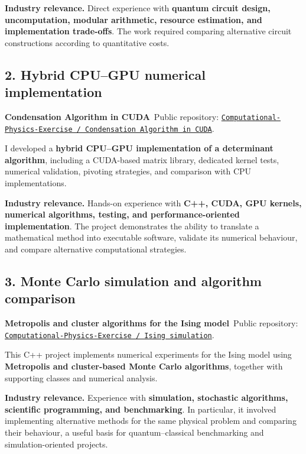 \documentclass[10pt,a4paper]{article}
\newcommand{\relevance}[1]{\textbf{Industry relevance.} #1}
\begin{document}
\relevance{Direct experience with \textbf{quantum circuit design, uncomputation, modular arithmetic, resource estimation,
and implementation trade-offs}. The work required comparing alternative circuit constructions according to quantitative
costs.}

\subsection*{2. Hybrid CPU--GPU numerical implementation}

\textbf{Condensation Algorithm in CUDA}\
Public repository:
\href{https://github.com/MasterToninus/Computational-Physics-Exercise/tree/master/Condensation\%20Algorithm\%20in\%20CUDA}
{\texttt{Computational-Physics-Exercise / Condensation Algorithm in CUDA}}.

I developed a \textbf{hybrid CPU--GPU implementation of a determinant algorithm}, including a CUDA-based matrix library,
dedicated kernel tests, numerical validation, pivoting strategies, and comparison with CPU implementations.

\relevance{Hands-on experience with \textbf{C++, CUDA, GPU kernels, numerical algorithms, testing, and performance-oriented
implementation}. The project demonstrates the ability to translate a mathematical method into executable software,
validate its numerical behaviour, and compare alternative computational strategies.}

\subsection*{3. Monte Carlo simulation and algorithm comparison}

\textbf{Metropolis and cluster algorithms for the Ising model}\
Public repository:
\href{https://github.com/MasterToninus/Computational-Physics-Exercise/tree/master/Ising\%20simulation\%20Metropolis\%20vs\%20Cluster}
{\texttt{Computational-Physics-Exercise / Ising simulation}}.

This C++ project implements numerical experiments for the Ising model using \textbf{Metropolis and cluster-based
Monte Carlo algorithms}, together with supporting classes and numerical analysis.

\relevance{Experience with \textbf{simulation, stochastic algorithms, scientific programming, and benchmarking}.
In particular, it involved implementing alternative methods for the same physical problem and comparing their behaviour,
a useful basis for quantum--classical benchmarking and simulation-oriented projects.}
\end{document}

